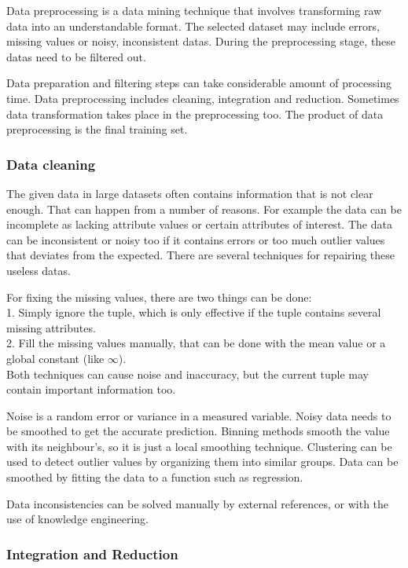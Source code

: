 Data preprocessing is a data mining technique that involves transforming raw data into an understandable format. The selected dataset may include errors, missing values or noisy, inconsistent datas. During the preprocessing stage, these datas need to be filtered out. \medskip

Data preparation and filtering steps can take considerable amount of processing time. Data preprocessing includes cleaning, integration and reduction. Sometimes data transformation takes place in the preprocessing too. The product of data preprocessing is the final training set.


\subsubsection{Data cleaning}

The given data in large datasets often contains information that is not clear enough. That can happen from a number of reasons. For example the data can be incomplete as lacking attribute values or certain attributes of interest. The data can be inconsistent or noisy too if it contains errors or too much outlier values that deviates from the expected. There are several techniques for repairing these useless datas.\bigskip

\noindent For fixing the missing values, there are two things can be done:\\
1. Simply ignore the tuple, which is only effective if the tuple contains several missing attributes.\\
2. Fill the missing values manually, that can be done with the mean value or a global constant (like $\infty$).\\
Both techniques can cause noise and inaccuracy, but the current tuple may contain important information too.\medskip

Noise is a random error or variance in a measured variable. Noisy data needs to be smoothed to get the accurate prediction. Binning methods smooth the value with its neighbour's, so it is just a local smoothing technique. Clustering can be used to detect outlier values by organizing them into similar groups. Data can be smoothed by fitting the data to a function such as regression.\medskip

Data inconsistencies can be solved manually by external references, or with the use of knowledge engineering.


\subsubsection{Integration and Reduction}

